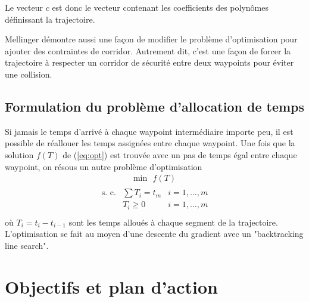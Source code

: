 Le vecteur $c$ est donc le vecteur contenant les coefficients des polynômes définissant la trajectoire. 

Mellinger démontre aussi une façon de modifier le problème d'optimisation pour ajouter des contraintes de corridor. Autrement dit, c'est une façon de forcer la trajectoire à respecter un corridor de sécurité entre deux waypoints pour éviter une collision.

\subsection{Formulation du problème d'allocation de temps}

Si jamais le temps d'arrivé à chaque waypoint intermédiaire importe peu, il est possible de réallouer les temps assignées entre chaque waypoint. Une fois que la solution $f(T)$ de (\ref{eq:opt}) est trouvée avec un pas de temps égal entre chaque waypoint, on résous un autre problème d'optimisation
\begin{align}\label{eq:time_opt}
\text{min}\ \ \ f(T)
\end{align}\begin{align*}
\begin{array}{lll}
\text{s. c.} & \sum T_i = t_m & i = 1,\ldots,m\\
& T_i \geq 0 &  i = 1,\ldots,m\\
\end{array}
\end{align*}
où $T_i = t_i - t_{i-1}$ sont les temps alloués à chaque segment de la trajectoire. L'optimisation se fait au moyen d'une descente du gradient avec un "backtracking line search".

\section{Objectifs et plan d'action}


